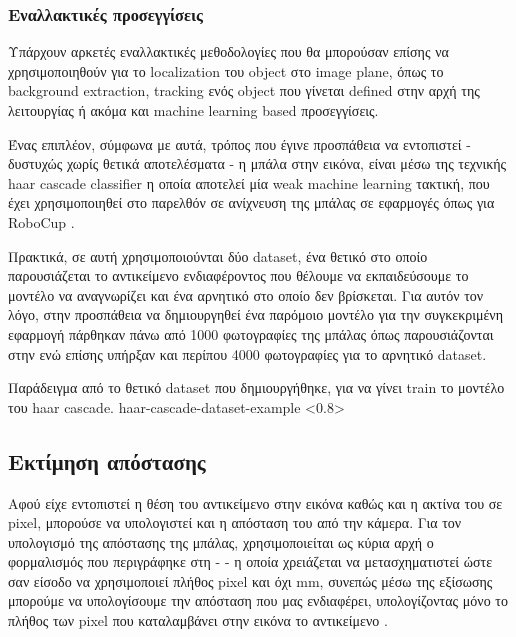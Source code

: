 \subsubsection{Εναλλακτικές προσεγγίσεις}
Υπάρχουν αρκετές εναλλακτικές μεθοδολογίες που θα μπορούσαν επίσης να χρησιμοποιηθούν για το localization του object στο image plane, όπως το background extraction, tracking ενός object που γίνεται defined στην αρχή της λειτουργίας ή ακόμα και machine learning based προσεγγίσεις. 

Ένας επιπλέον, σύμφωνα με αυτά, τρόπος που έγινε προσπάθεια να εντοπιστεί - δυ\-στυ\-χώς χωρίς θετικά αποτελέσματα - η μπάλα στην εικόνα, είναι μέσω της τεχνικής haar cascade classifier \cite{opencv-haar-cascade} η οποία αποτελεί μία weak machine learning τακτική, που έχει χρησιμοποιηθεί στο παρελθόν σε ανίχνευση της μπάλας σε εφαρμογές όπως για RoboCup \cite{opencv-haar-cascade-robot1} \cite{opencv-haar-cascade-robot2}.

Πρακτικά, σε αυτή χρησιμοποιούνται δύο dataset, ένα θετικό στο οποίο παρουσιάζεται το αντικείμενο ενδιαφέροντος που θέλουμε να εκπαιδεύσουμε το μοντέλο να αναγνωρίζει και ένα αρνητικό στο οποίο δεν βρίσκεται. Για αυτόν τον λόγο, στην προσπάθεια να δημιουργηθεί ένα παρόμοιο μοντέλο για την συγκεκριμένη εφαρμογή πάρθηκαν πάνω από 1000 φωτογραφίες της μπάλας όπως παρουσιάζονται στην  ενώ επίσης υπήρξαν και περίπου 4000 φωτογραφίες για το αρνητικό dataset.

{Παράδειγμα από το θετικό dataset που δημιουργήθηκε, για να γίνει train το μοντέλο του haar cascade.} %
{haar-cascade-dataset-example} %
<0.8>


\subsection{Εκτίμηση απόστασης}
Αφού είχε εντοπιστεί η θέση του αντικείμενο στην εικόνα καθώς και η ακτίνα του σε pixel, μπορούσε να υπολογιστεί και η απόσταση του από την κάμερα. 
Για τον υπολογισμό της απόστασης της μπάλας, χρησιμοποιείται ως κύρια αρχή ο φο\-ρμα\-λι\-σμός που περιγράφηκε στη  -  - η οποία χρειάζεται να μετασχηματιστεί ώστε σαν είσοδο να χρησιμοποιεί πλήθος pixel και όχι mm, συνεπώς μέσω της εξίσωσης  μπορούμε να υπολογίσουμε την απόσταση που μας ενδιαφέρει, υπολογίζοντας μόνο το πλήθος των pixel που καταλαμβάνει στην εικόνα το αντικείμενο \cite{calculate-distance-stackexchange} \cite{calculate-distance-or-size-of-an-objectin-a-photo-image}.

